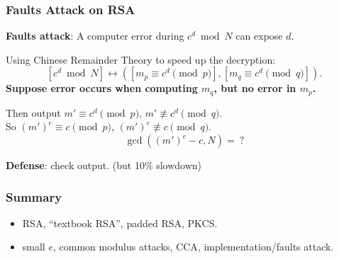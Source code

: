 \begin{frame}\frametitle{Faults Attack on RSA}
\textbf{Faults attack}:
A computer error during $c^d\bmod N$ can expose $d$.\newline

Using Chinese Remainder Theory to speed up the decryption:
\[ [c^d \bmod N] \leftrightarrow ([m_p \equiv c^d \pmod p],[m_q \equiv c^d \pmod q]).\]
\textbf{Suppose error occurs when computing $m_q$, but no error in $m_p$.}\newline

Then output $m' \equiv c^d \pmod p$, $m' \not \equiv c^d \pmod q$.\\
So $(m')^e \equiv c \pmod p$, $(m')^e \not \equiv c \pmod q$.\\
\alert{\[\gcd((m')^e-c, N)=\ ?\]}

\textbf{Defense}: check output. (but 10\% slowdown)
\end{frame}
\begin{frame}\frametitle{Summary}
\begin{itemize}
\item RSA, ``textbook RSA'', padded RSA, PKCS.
\item small $e$, common modulus attacks, CCA, implementation/faults attack.
\end{itemize}
\end{frame}
